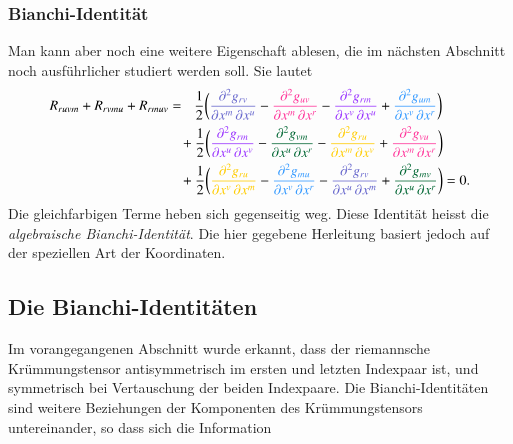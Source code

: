 \subsubsection{Bianchi-Identität}
Man kann aber noch eine weitere Eigenschaft ablesen, die im nächsten
Abschnitt noch ausführlicher studiert werden soll.
Sie lautet
\bgroup
{}
\begin{align}
R_{ruvm}
+
R_{rvmu}
+
R_{rmuv}
&=\phantom{+}
\frac12
\biggl(
{\color{farbeeins}
\frac{\partial^2 g_{rv}}{\partial x^m\,\partial x^u}
}
-
{\color{farbezwei}
\frac{\partial^2 g_{uv}}{\partial x^m\,\partial x^r}
}
-
{\color{farbedrei}
\frac{\partial^2 g_{rm}}{\partial x^v\,\partial x^u}
}
+
{\color{farbevier}
\frac{\partial^2 g_{um}}{\partial x^v\,\partial x^r}
}
\biggr)
\notag
\\
&\phantom{=}
\,
+
\frac12
\biggl(
{\color{farbedrei}
\frac{\partial^2 g_{rm}}{\partial x^u\,\partial x^v}
}
-
{\color{farbefuenf}
\frac{\partial^2 g_{vm}}{\partial x^u\,\partial x^r}
}
-
{\color{farbesechs}
\frac{\partial^2 g_{ru}}{\partial x^m\,\partial x^v}
}
+
{\color{farbezwei}
\frac{\partial^2 g_{vu}}{\partial x^m\,\partial x^r}
}
\biggr)
\notag
\\
&\phantom{=}
\,
+
\frac12
\biggl(
{\color{farbesechs}
\frac{\partial^2 g_{ru}}{\partial x^v\,\partial x^m}
}
-
{\color{farbevier}
\frac{\partial^2 g_{mu}}{\partial x^v\,\partial x^r}
}
-
{\color{farbeeins}
\frac{\partial^2 g_{rv}}{\partial x^u\,\partial x^m}
}
+
{\color{farbefuenf}
\frac{\partial^2 g_{mv}}{\partial x^u\,\partial x^r}
}
\biggr)
=
0.
\label{buch:kruemmgun:kruemmung:eqn:normalbianchi}
\end{align}
\egroup
Die gleichfarbigen Terme heben sich gegenseitig weg.
Diese Identität heisst die \emph{algebraische Bianchi-Identität}.
Die hier gegebene Herleitung basiert jedoch auf der speziellen
Art der Koordinaten.

%
%
\subsection{Die Bianchi-Identitäten}
Im vorangegangenen Abschnitt wurde erkannt, dass der riemannsche 
Krümmungstensor antisymmetrisch im ersten und letzten Indexpaar ist,
und symmetrisch bei Vertauschung der beiden Indexpaare.
Die Bianchi-Identitäten sind weitere Beziehungen der Komponenten
des Krümmungstensors untereinander, so dass sich die Information 

